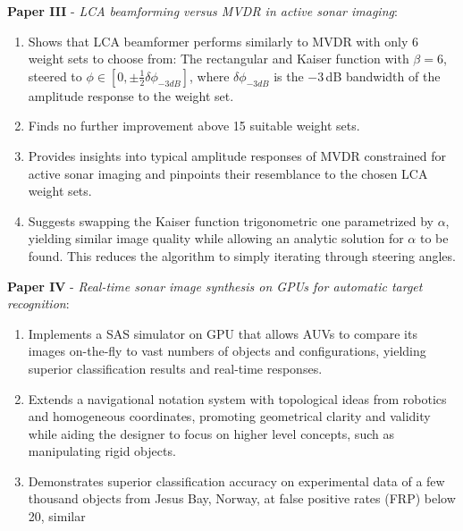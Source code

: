 \textbf{Paper III} - \textit{LCA beamforming versus MVDR in active sonar imaging}:
\begin{enumerate}
\item Shows that LCA beamformer performs similarly to MVDR with only 6 weight sets to choose from: The rectangular and Kaiser function with $\beta=6$, steered to $\phi\in[0,\pm\frac{1}{2}\delta{\phi_{-3dB}}]$, where $\delta{\phi_{-3dB}}$ is the $-3$\,dB bandwidth of the amplitude response to the weight set.
\item Finds no further improvement above 15 suitable weight sets.
\item Provides insights into typical amplitude responses of MVDR constrained for active sonar imaging and pinpoints their resemblance to the chosen LCA weight sets. 
\item Suggests swapping the Kaiser function trigonometric one parametrized by $\alpha$, yielding similar image quality while allowing an analytic solution for $\alpha$ to be found. This reduces the algorithm to simply iterating through steering angles.
\end{enumerate}

\textbf{Paper IV} - \textit{Real-time sonar image synthesis on GPUs for automatic target recognition}:
\begin{enumerate}
\item Implements a SAS simulator on GPU that allows AUVs to compare its images on-the-fly to vast numbers of objects and configurations, yielding superior classification results and real-time responses.
\item Extends a navigational notation system with topological ideas from robotics and homogeneous coordinates, promoting geometrical clarity and validity while aiding the designer to focus on higher level concepts, such as manipulating rigid objects.
\item Demonstrates superior classification accuracy on experimental data of a few thousand objects from Jesus Bay, Norway, at false positive rates (FRP) below 20, similar %
\end{enumerate}





